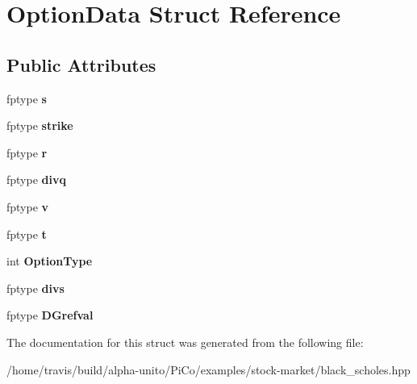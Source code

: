 \hypertarget{struct_option_data}{\section{\-Option\-Data \-Struct \-Reference}
\label{struct_option_data}
}
\subsection*{\-Public \-Attributes}
\begin{DoxyCompactItemize}
\item 
\hypertarget{struct_option_data_aa251ba05c85ecc3f7a6a2d9e6833167c}{fptype {\bfseries s}}\label{struct_option_data_aa251ba05c85ecc3f7a6a2d9e6833167c}

\item 
\hypertarget{struct_option_data_aa26659a7028a77f5a7a262e56613d49c}{fptype {\bfseries strike}}\label{struct_option_data_aa26659a7028a77f5a7a262e56613d49c}

\item 
\hypertarget{struct_option_data_afd5395299014f314194ebfc9698b0c77}{fptype {\bfseries r}}\label{struct_option_data_afd5395299014f314194ebfc9698b0c77}

\item 
\hypertarget{struct_option_data_afa669f300f15d3a332b260ee111a9058}{fptype {\bfseries divq}}\label{struct_option_data_afa669f300f15d3a332b260ee111a9058}

\item 
\hypertarget{struct_option_data_a4af3d7c170b09e052a19104d167bc446}{fptype {\bfseries v}}\label{struct_option_data_a4af3d7c170b09e052a19104d167bc446}

\item 
\hypertarget{struct_option_data_adabce6a96dac3a882bfa7aff54d68783}{fptype {\bfseries t}}\label{struct_option_data_adabce6a96dac3a882bfa7aff54d68783}

\item 
\hypertarget{struct_option_data_ac699cb4236b49115e979d9e1c381252f}{int {\bfseries \-Option\-Type}}\label{struct_option_data_ac699cb4236b49115e979d9e1c381252f}

\item 
\hypertarget{struct_option_data_a589bc62eabfa5946672400b9f2ad2cba}{fptype {\bfseries divs}}\label{struct_option_data_a589bc62eabfa5946672400b9f2ad2cba}

\item 
\hypertarget{struct_option_data_ade725f66587cd311d2414267aa668310}{fptype {\bfseries \-D\-Grefval}}\label{struct_option_data_ade725f66587cd311d2414267aa668310}

\end{DoxyCompactItemize}


\-The documentation for this struct was generated from the following file\-:\begin{DoxyCompactItemize}
\item 
/home/travis/build/alpha-\/unito/\-Pi\-Co/examples/stock-\/market/black\-\_\-scholes.\-hpp\end{DoxyCompactItemize}
